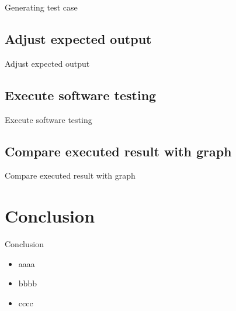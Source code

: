\documentclass{beamer}
\begin{document}
\begin{frame}{Generating test case}
\end{frame}

\subsection{Adjust expected output}
\begin{frame}{Adjust expected output}
\end{frame}

\subsection{Execute software testing}
\begin{frame}{Execute software testing}
\end{frame}

\subsection{Compare executed result with graph}
\begin{frame}{Compare executed result with graph}
\end{frame}

%
\section{Conclusion}
\begin{frame}{Conclusion}
    \begin{itemize}
        \item<1->aaaa
        \item<2->bbbb
        \item<3->cccc
    \end{itemize}
\end{frame}
\end{document}
